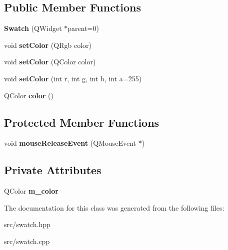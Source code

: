 \subsection*{Public Member Functions}
\begin{DoxyCompactItemize}
\item 
\hypertarget{classSwatch_ad411aab2ef21c65041939bfe3fe77b0e}{{\bfseries Swatch} (Q\-Widget $\ast$parent=0)}\label{classSwatch_ad411aab2ef21c65041939bfe3fe77b0e}

\item 
\hypertarget{classSwatch_a306fa88806e4b2d1fbf4e70f5878ae52}{void {\bfseries set\-Color} (Q\-Rgb color)}\label{classSwatch_a306fa88806e4b2d1fbf4e70f5878ae52}

\item 
\hypertarget{classSwatch_a53bfaa32646c4ee3555419f1edb5820d}{void {\bfseries set\-Color} (Q\-Color color)}\label{classSwatch_a53bfaa32646c4ee3555419f1edb5820d}

\item 
\hypertarget{classSwatch_aea70e9f1fd2b26b3e686b615b734d27a}{void {\bfseries set\-Color} (int r, int g, int b, int a=255)}\label{classSwatch_aea70e9f1fd2b26b3e686b615b734d27a}

\item 
\hypertarget{classSwatch_a6104b4c53efb97a496dd3554bf542ebb}{Q\-Color {\bfseries color} ()}\label{classSwatch_a6104b4c53efb97a496dd3554bf542ebb}

\end{DoxyCompactItemize}
\subsection*{Protected Member Functions}
\begin{DoxyCompactItemize}
\item 
\hypertarget{classSwatch_ab9aacb2c821dce15d22f54d34b68d023}{void {\bfseries mouse\-Release\-Event} (Q\-Mouse\-Event $\ast$)}\label{classSwatch_ab9aacb2c821dce15d22f54d34b68d023}

\end{DoxyCompactItemize}
\subsection*{Private Attributes}
\begin{DoxyCompactItemize}
\item 
\hypertarget{classSwatch_ac7c3eb52b20545b969f7aea97c985d5d}{Q\-Color {\bfseries m\-\_\-color}}\label{classSwatch_ac7c3eb52b20545b969f7aea97c985d5d}

\end{DoxyCompactItemize}


The documentation for this class was generated from the following files\-:\begin{DoxyCompactItemize}
\item 
src/swatch.\-hpp\item 
src/swatch.\-cpp\end{DoxyCompactItemize}
